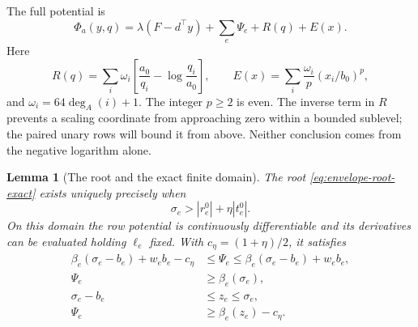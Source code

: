 \documentclass[11pt]{article}
\newtheorem{lemma}[theorem]{Lemma}
\theoremstyle{definition}\newtheorem{definition}[theorem]{Definition}
\theoremstyle{remark}\newtheorem{remark}[theorem]{Remark}
\begin{document}
The full potential is
\begin{equation}\label{eq:potential}
 \Phi_a(y,q)=\lambda(F-d^\top y)+\sum_e\Psi_e+R(q)+E(x).
\end{equation}
Here
\[
 R(q)=\sum_i\omega_i\left[\frac{a_0}{q_i}-\log\frac{q_i}{a_0}\right],
 \qquad E(x)=\sum_i\frac{\omega_i}{p}(x_i/b_0)^p,
\]
and $\omega_i=64\deg_A(i)+1$.
The integer $p\ge2$ is even.  The inverse term in $R$ prevents a
scaling coordinate from approaching zero within a bounded sublevel;
the paired unary rows will bound it from above.  Neither conclusion
comes from the negative logarithm alone.

\begin{lemma}[The root and the exact finite domain]
\label{lem:envelope-root}\label{lem:envelope-domain}
The root \eqref{eq:envelope-root-exact} exists uniquely precisely when
\[
 \boxed{\sigma_e>|r_e^0|+\eta|t_e^0|.}
\]
On this domain the row potential is continuously differentiable and
its derivatives can be evaluated holding $\ell_e$ fixed.  With
$c_\eta=(1+\eta)/2$, it satisfies
\begin{align}
 \beta_e(\sigma_e-b_e)+w_eb_e-c_\eta
 &\le\Psi_e\le\beta_e(\sigma_e-b_e)+w_eb_e,
 \label{eq:scalar-sandwich}\\
 \Psi_e&\ge\beta_e(\sigma_e),
 \label{eq:barrier-lower}\\
 \sigma_e-b_e&\le z_e\le\sigma_e,
 \label{eq:root-slack-range}\\
 \Psi_e&\ge\beta_e(z_e)-c_\eta.
 \label{eq:root-value-lower}
\end{align}
\end{lemma}
\end{document}
